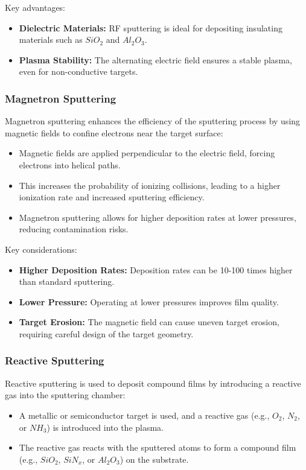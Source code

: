 \documentclass{report}
\begin{document}
Key advantages:
\begin{itemize}
    \item \textbf{Dielectric Materials:} RF sputtering is ideal for depositing insulating materials such as $SiO_2$ and $Al_2O_3$.
    \item \textbf{Plasma Stability:} The alternating electric field ensures a stable plasma, even for non-conductive targets.
\end{itemize}

\subsubsection{Magnetron Sputtering}
Magnetron sputtering enhances the efficiency of the sputtering process by using magnetic fields to confine electrons near the target surface:
\begin{itemize}
    \item Magnetic fields are applied perpendicular to the electric field, forcing electrons into helical paths.
    \item This increases the probability of ionizing collisions, leading to a higher ionization rate and increased sputtering efficiency.
    \item Magnetron sputtering allows for higher deposition rates at lower pressures, reducing contamination risks.
\end{itemize}

Key considerations:
\begin{itemize}
    \item \textbf{Higher Deposition Rates:} Deposition rates can be 10-100 times higher than standard sputtering.
    \item \textbf{Lower Pressure:} Operating at lower pressures improves film quality.
    \item \textbf{Target Erosion:} The magnetic field can cause uneven target erosion, requiring careful design of the target geometry.
\end{itemize}

\subsubsection{Reactive Sputtering}
Reactive sputtering is used to deposit compound films by introducing a reactive gas into the sputtering chamber:
\begin{itemize}
    \item A metallic or semiconductor target is used, and a reactive gas (e.g., $O_2$, $N_2$, or $NH_3$) is introduced into the plasma.
    \item The reactive gas reacts with the sputtered atoms to form a compound film (e.g., $SiO_2$, $SiN_x$, or $Al_2O_3$) on the substrate.
\end{itemize}
\end{document}
